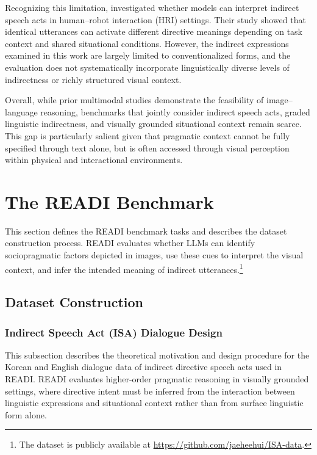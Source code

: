 \documentclass[11pt]{article}
\begin{document}
Recognizing this limitation, \citet{zhang2025can} investigated whether models can interpret indirect speech acts in human–robot interaction (HRI) settings. Their study showed that identical utterances can activate different directive meanings depending on task context and shared situational conditions. However, the indirect expressions examined in this work are largely limited to conventionalized forms, and the evaluation does not systematically incorporate linguistically diverse levels of indirectness or richly structured visual context.

Overall, while prior multimodal studies demonstrate the feasibility of image–language reasoning, benchmarks that jointly consider indirect speech acts, graded linguistic indirectness, and visually grounded situational context remain scarce. This gap is particularly salient given that pragmatic context cannot be fully specified through text alone, but is often accessed through visual perception within physical and interactional environments.

\section{The READI Benchmark}

This section defines the READI benchmark tasks and describes the dataset construction process. 
READI evaluates whether LLMs can identify sociopragmatic factors depicted in images, use these cues to interpret the visual context, and infer the intended meaning of indirect utterances.\footnote{The dataset is publicly available at \url{https://github.com/jaeheehui/ISA-data}.}

\subsection{Dataset Construction}
\label{sec:dataset-construction}

\subsubsection{Indirect Speech Act (ISA) Dialogue Design}

This subsection describes the theoretical motivation and design procedure for the Korean and English dialogue data of indirect directive speech acts used in READI. READI evaluates higher-order pragmatic reasoning in visually grounded settings, where directive intent must be inferred from the interaction between linguistic expressions and situational context rather than from surface linguistic form alone.
\end{document}
